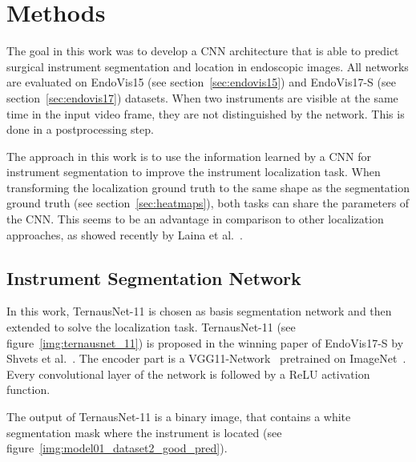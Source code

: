 \chapter{Methods}
\label{cha:methods}

The goal in this work was to develop a CNN architecture that is able to predict surgical instrument segmentation and location in endoscopic images. All networks are evaluated on EndoVis15 (see section~\ref{sec:endovis15}) and EndoVis17-S (see section~\ref{sec:endovis17}) datasets.
When two instruments are visible at the same time in the input video frame, they are not distinguished by the network. This is done in a postprocessing step.

The approach in this work is to use the information learned by a CNN for instrument segmentation to improve the instrument localization task. When transforming the localization ground truth to the same shape as the segmentation ground truth (see section~\ref{sec:heatmaps}), both tasks can share the parameters of the CNN. This seems to be an advantage in comparison to other localization approaches, as showed recently by Laina et al.~\cite{Laina2017}.
  
\section{Instrument Segmentation Network}
\label{sec:TernausNet_11}
In this work, TernausNet-11 is chosen as basis segmentation network and then extended to solve the localization task.
TernausNet-11 (see figure~\ref{img:ternausnet_11}) is proposed in the winning paper of EndoVis17-S by Shvets et al.~\cite{Shvets2018}. 
The encoder part is a VGG11-Network~\cite{simonyan2014vgg} pretrained on ImageNet~\cite{imageNetWinner2012krizhevsky}. Every convolutional layer of the network is followed by a ReLU activation function. 

The output of TernausNet-11 is a binary image, that contains a white segmentation mask where the instrument is located (see figure~\ref{img:model01_dataset2_good_pred}).

